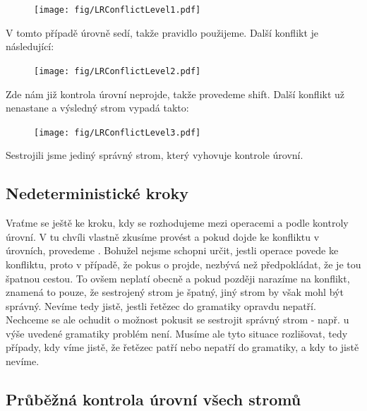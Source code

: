 \begin{exmp}
  \begin{figure}[H]
    \centering
    \texttt{[image: fig/LRConflictLevel1.pdf]}
  \end{figure}

  V tomto případě úrovně sedí, takže pravidlo použijeme.
  Další konflikt je následující:

  \begin{figure}[H]
    \centering
    \texttt{[image: fig/LRConflictLevel2.pdf]}
  \end{figure}

  Zde nám již kontrola úrovní neprojde, takže provedeme shift.
  Další konflikt už nenastane a výsledný strom vypadá takto:

  \begin{figure}[H]
    \centering
    \texttt{[image: fig/LRConflictLevel3.pdf]}
  \end{figure}

  Sestrojili jsme jediný správný strom, který vyhovuje kontrole úrovní.
\end{exmp}

\subsection{Nedeterministické kroky}
\label{subsec:nondetSteps}

Vraťme se ještě ke kroku, kdy se rozhodujeme mezi operacemi  a
 podle kontroly úrovní. V tu chvíli vlastně zkusíme provést
 a pokud dojde ke konfliktu v úrovních, provedeme .
Bohužel nejsme schopni určit, jestli operace  povede ke konfliktu,
proto v případě, že pokus o  projde, nezbývá než předpokládat, že
 je tou špatnou cestou.
To ovšem neplatí obecně a pokud později narazíme na konflikt, znamená to
pouze, že sestrojený strom je špatný, jiný strom by však mohl být správný.
Nevíme tedy jistě, jestli řetězec do gramatiky opravdu nepatří.\\

Nechceme se ale ochudit o možnost pokusit se sestrojit správný strom
- např. u výše uvedené gramatiky problém není.
Musíme ale tyto situace rozlišovat, tedy případy, kdy víme jistě,
že řetězec patří nebo nepatří do gramatiky, a kdy to jistě nevíme.\\

\subsection{Průběžná kontrola úrovní všech stromů}
\label{subsec:contLevCheckRightTrees}

